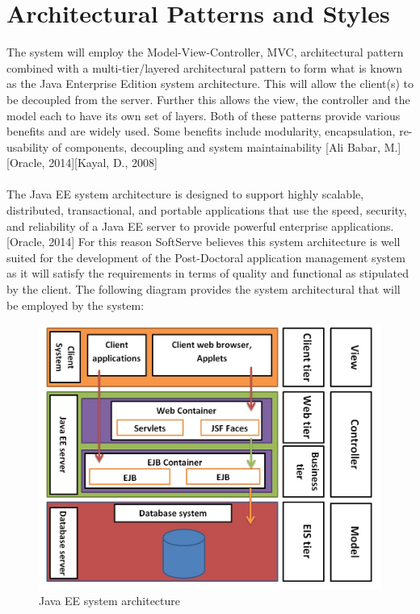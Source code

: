 \documentclass[12pt]{article}
\begin{document}


\section{Architectural Patterns and Styles} %


The system will employ the Model-View-Controller, MVC, architectural pattern combined with a multi-tier/layered architectural pattern to form what is known as the Java Enterprise Edition system architecture. This will allow the client(s) to be decoupled from the server. Further this allows the view, the controller and the model each to have its own set of layers. Both of these patterns provide various benefits and are widely used. Some benefits include modularity, encapsulation, re-usability of components, decoupling and system maintainability [Ali Babar, M.] [Oracle, 2014][Kayal, D., 2008]\\
\\
The Java EE system architecture is designed to support highly scalable, distributed, transactional, and portable applications that use the speed, security, and reliability of a Java EE server to provide powerful enterprise applications. [Oracle, 2014] For this reason SoftServe believes this system architecture is well suited for the development of the Post-Doctoral application management system as it will satisfy the requirements in terms of quality and functional as stipulated by the client. The following diagram provides the system architectural that will be employed by the system:\\

\begin{figure}[H]
\centering
\includegraphics[scale=0.8]{../Images_Docs/Diagrams/Architecture/Java EE system architecture.jpg}
\caption{Java EE system architecture}
\end{figure}
\end{document}
